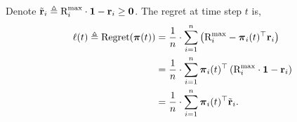 Denote ${\tilde{\mathbf{r}}}_{i} \triangleq {\text{R}}_i^{\max} \cdot {\mathbf{1}} -  {\mathbf{r}}_{i} \ge {\mathbf{0}}$. The regret at time step $t$ is,
\begin{equation*}
\begin{split}
	\ell(t) \triangleq {\text{Regret}}({\boldsymbol{\pi}}(t)) &= \frac{1}{n} \cdot \sum\limits_{i=1}^{n}{ \left( {\text{R}}_i^{\max} - {\boldsymbol{\pi}}_{i}(t)^\top {\mathbf{r}}_i \right) } \\
	&= \frac{1}{n} \cdot \sum\limits_{i=1}^{n}{ {\boldsymbol{\pi}}_{i}(t)^\top \left( {\text{R}}_i^{\max} \cdot {\mathbf{1}} - {\mathbf{r}}_{i} \right) } \\
	&= \frac{1}{n} \cdot \sum\limits_{i=1}^{n}{ {\boldsymbol{\pi}}_{i}(t)^\top {\tilde{\mathbf{r}}}_{i} }.
\end{split}
\end{equation*}
